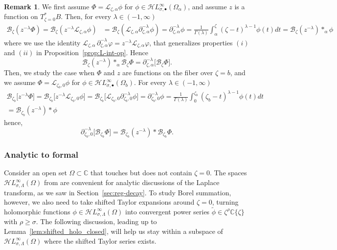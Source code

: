 \documentclass{article}
\newcommand{\singexp}[2]{\mathcal{H}L^\infty_{#1, #2}}
\newcommand{\singexpalg}[1]{\singexp{#1}{\bullet}}
\newcommand{\C}{\mathbb{C}}
\newcommand{\series}[1]{\tilde{#1}}
\newcommand{\fracderiv}[3]{\partial^{#1}_{#2, #3}}
\newcommand{\laplace}{\mathcal{L}}
\newcommand{\borel}{\mathcal{B}}
\theoremstyle{definition}
\newtheorem{remark}[definition]{Remark}
\theoremstyle{plain}
\newenvironment{verify}{\color{ForestGreen}}{\color{black}}
\begin{document}
\begin{verify}
\begin{remark}
We first assume $\Phi=\laplace_{\zeta,\alpha}\phi$ for $\phi\in\singexpalg{\sigma}(\Omega_\alpha)$, and assume $z$ is a function on $T^*_{\zeta=0}B$. Then, for every $\lambda\in (-1,\infty)$
\begin{align*}
    \borel_\zeta(z^{-\lambda}{\Phi})=\borel_\zeta(z^{-\lambda}\laplace_{\zeta,\alpha}\phi)&=\borel_\zeta(\laplace_{\zeta,\alpha}\partial_{\zeta,\alpha}^{-\lambda}\phi)=\partial_{\zeta,\alpha}^{-\lambda}\phi=\frac{1}{\Gamma(\lambda)}\int_{\alpha}^\zeta (\zeta-t)^{\lambda-1}\phi(t)dt=\borel_\zeta (z^{-\lambda})\ast_\alpha\phi
\end{align*}
where we use the identity $\laplace_{\zeta, \alpha}\,\fracderiv{-\lambda}{\zeta}{\alpha} \varphi = z^{-\lambda} \laplace_{\zeta, \alpha} \varphi$, that generalizes properties $(i)$ and $(ii)$ in Proposition~\ref{prop:L-int-op}. Hence \[\borel_\zeta (z^{-\lambda})\ast_\alpha\borel_\zeta{\Phi}=\fracderiv{-\lambda}{\zeta}{\alpha}\big[\borel_\zeta\Phi\big].\]
Then, we study the case when $\Phi$ and $z$ are functions on the fiber over $\zeta=b$, and we assume $\Phi=\laplace_{\zeta_b,0}\phi$ for $\phi\in\singexpalg{\sigma}(\Omega_b)$. For every $\lambda\in (-1,\infty)$
\begin{multline*}
    \borel_{\zeta_b}\big[z^{-\lambda}\Phi\big]=\borel_{\zeta_b}\big[z^{-\lambda}\laplace_{\zeta_b,0}\phi\big]=\borel_{\zeta_b}\big[\laplace_{\zeta_b,0}\partial_{\zeta_b,0}^{-\lambda}\phi\big]=\partial_{\zeta_b,0}^{-\lambda}\phi=\frac{1}{\Gamma(\lambda)}\int_{0}^{\zeta_b} (\zeta_b-t)^{\lambda-1}\phi(t)dt\\
    =\borel_{\zeta_b}(z^{-\lambda})\ast\phi
\end{multline*}
hence,  \[\partial_{\zeta_b,0}^{-\lambda}\big[\borel_{\zeta_b}\Phi\big]=\borel_{\zeta_b} (z^{-\lambda})\ast\borel_{\zeta_b}{\Phi}.\]
\end{remark}
\end{verify}
%
\subsubsection{Analytic to formal}
%
Consider an open set $\Omega \subset \C$ that touches but does not contain $\zeta = 0$. The spaces $\singexp{\sigma}{\Lambda}(\Omega)$ from \cite{reg-sing-volterra} are convenient for analytic discussions of the Laplace transform, as we saw in Section~\ref{sec:reg-decay}. To study Borel summation, however, we also need to take shifted Taylor expansions around $\zeta = 0$, turning holomorphic functions $\phi \in \singexp{\sigma}{\Lambda}(\Omega)$ into convergent power series $\series{\phi} \in \zeta^\rho \C\{\zeta\}$ with $\rho \ge \sigma$. The following discussion, leading up to Lemma~\ref{lem:shifted_holo_closed}, will help us stay within a subspace of $\singexp{\sigma}{\Lambda}(\Omega)$ where the shifted Taylor series exists.
\end{document}
